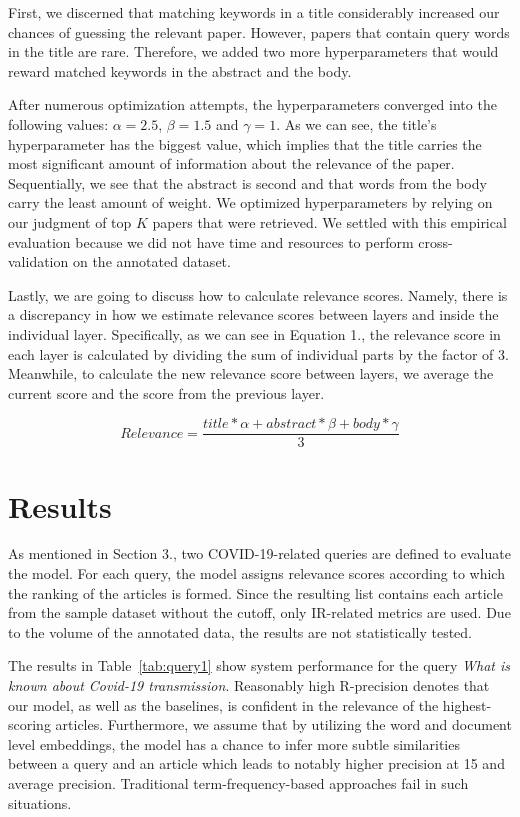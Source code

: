 \documentclass[10pt, a4paper]{article}
\begin{document}
First, we discerned that matching keywords in a title considerably increased our chances of guessing the relevant paper. However, papers that contain query words in the title are rare. Therefore, we added two more hyperparameters that would reward matched keywords in the abstract and the body. 

After numerous optimization attempts, the hyperparameters converged into the following values: $\alpha = 2.5$, $\beta = 1.5$ and $\gamma = 1$. As we can see, the title's hyperparameter has the biggest value, which implies that the title carries the most significant amount of information about the relevance of the paper. Sequentially, we see that the abstract is second and that words from the body carry the least amount of weight. We optimized hyperparameters by relying on our judgment of top $K$ papers that were retrieved. We settled with this empirical evaluation because we did not have time and resources to perform cross-validation on the annotated dataset.

Lastly, we are going to discuss how to calculate relevance scores. Namely, there is a discrepancy in how we estimate relevance scores between layers and inside the individual layer. Specifically, as we can see in Equation 1., the relevance score in each layer is calculated by dividing the sum of individual parts by the factor of 3. Meanwhile, to calculate the new relevance score between layers, we average the current score and the score from the previous layer. 


\begin{equation}
Relevance = \frac{title*\alpha + abstract*\beta + body*\gamma}{3}
\end{equation}


	
	\section{Results}
	
	As mentioned in Section 3., two COVID-19-related queries are defined to evaluate the model. For each query, the model assigns relevance scores according to which the ranking of the articles is formed. Since the resulting list contains each article from the sample dataset without the cutoff, only IR-related metrics are used. Due to the volume of the annotated data, the results are not statistically tested. 
	
	The results in Table~\ref{tab:query1} show system performance for the query \textit{What is known about Covid-19 transmission}. Reasonably high R-precision denotes that our model, as well as the baselines, is confident in the relevance of the highest-scoring articles. Furthermore, we assume that by utilizing the word and document level embeddings, the model has a chance to infer more subtle similarities between a query and an article which leads to notably higher precision at 15 and average precision. Traditional term-frequency-based approaches fail in such situations.
	
\end{document}
